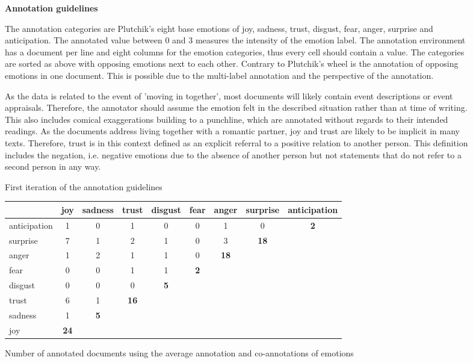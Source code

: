 \documentclass[a4,12pt]{scrartcl}
\begin{document}
\begin{figure}
\centering
\begin{tcolorbox}
\textbf{\sffamily Annotation guidelines}

The annotation categories are Plutchik's eight base emotions of joy, sadness, trust, disgust, fear, anger, surprise and anticipation. The annotated value between 0 and 3 measures the intensity of the emotion label. The annotation environment has a document per line and eight columns for the emotion categories, thus every cell should contain a value. The categories are sorted as above with opposing emotions next to each other. Contrary to Plutchik's wheel is the annotation of opposing emotions in one document. This is possible due to the multi-label annotation and the perspective of the annotation.

As the data is related to the event of 'moving in together', most documents will likely contain event descriptions or event appraisals. Therefore, the annotator should assume the emotion felt in the described situation rather than at time of writing. This also includes comical exaggerations building to a punchline, which are annotated without regards to their intended readings. As the documents address living together with a romantic partner, joy and trust are likely to be implicit in many texts. Therefore, trust is in this context defined as an explicit referral to a positive relation to another person. This definition includes the negation, i.e. negative emotions due to the absence of another person but not statements that do not refer to a second person in any way.

\end{tcolorbox}
\caption{First iteration of the annotation guidelines}
\end{figure}

\begin{figure}
\centering
\begin{tabular}{l|cccccccc}
& joy & sadness & trust & disgust & fear & anger & surprise & anticipation\\\hline
anticipation & 1 & 0 & 1 & 0 & 0 & 1 &  0 & \textbf{2} \\
surprise  & 7 & 1 & 2 & 1 & 0 & 3 & \textbf{18} \\
anger & 1 & 2 & 1 & 1 & 0 & \textbf{18} \\
fear & 0 & 0 & 1 & 1 & \textbf{2} \\
disgust & 0 & 0 & 0 & \textbf{5} \\
trust & 6 & 1 & \textbf{16} \\
sadness & 1 & \textbf{5} \\
joy & \textbf{24}\\
\end{tabular}
\caption{Number of annotated documents using the average annotation and co-annotations of emotions}
\end{figure}
\end{document}
